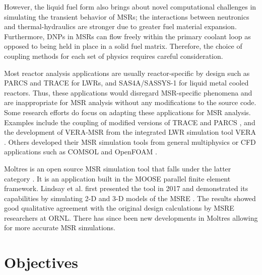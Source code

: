 However, the liquid fuel form also brings about novel computational
challenges in simulating the transient behavior of \glspl{MSR}; the
interactions between neutronics and thermal-hydraulics are stronger due
to greater fuel material expansion. Furthermore, \glspl{DNP} in \glspl{MSR}
can flow freely within the primary coolant
loop as opposed to being held in place in a solid fuel matrix. Therefore,
the choice of coupling methods for each set of physics requires careful
consideration. 

Most reactor analysis applications are usually reactor-specific by
design such as PARCS and TRACE for \glspl{LWR}, and SAS4A/SASSYS-1 for
liquid metal cooled reactors. Thus, these applications would disregard
\gls{MSR}-specific phenomena and are inappropriate for \gls{MSR}
analysis without any modifications to the source code. Some research efforts
do focus on adapting these applications for \gls{MSR} analysis. Examples
include the coupling of modified versions of TRACE and PARCS
\cite{pettersen_coupled_2016}, and the development of VERA-MSR from the
integrated \gls{LWR} simulation tool VERA \cite{graham_development_2019}.
Others developed their \gls{MSR} simulation tools from general
multiphysics or \gls{CFD} applications such as COMSOL
\cite{fiorina_modelling_2014} and OpenFOAM \cite{aufiero_development_2014}.

Moltres is an open source MSR simulation tool that falls under the latter
category \cite{lindsay_introduction_2018}. It is an application built in the
\gls{MOOSE} \cite{gaston_physics-based_2015} parallel finite element
framework. Lindsay et al. first presented the tool in 2017 and demonstrated
its capabilities by simulating 2-D and 3-D models of the \gls{MSRE}
\cite{lindsay_introduction_2018}. The results showed good qualitative
agreement with the original design calculations by \gls{MSRE} researchers at
\gls{ORNL}. There has since been new developments in Moltres allowing for
more accurate \gls{MSR} simulations.

\section{Objectives}

